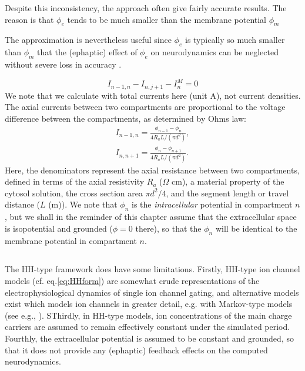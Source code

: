 Despite this inconsistency, the approach often give fairly accurate results. The reason is that $\phi_e$ tends to be much smaller than the membrane potential $\phi_m$


The approximation is nevertheless useful since $\phi_e$ is typically so much smaller than $\phi_m$ that the (ephaptic) effect of $\phi_e$ on neurodynamics can be neglected without severe loss in accuracy \cite{anastassiou2015}. 



\begin{equation}
I_{n-1,n} - I_{n,j+1} - I^M_n = 0
\label{eq:Kirch}
\end{equation}
We note that we calculate with total currents here (unit A), not current densities. The axial currents between two compartments are proportional to the voltage difference between the compartments, as determined by Ohms law:
\begin{eqnarray}
I_{n-1,n} = \frac{\phi_{n-1}-\phi_n}{4 R_a L/(\pi d^2)}, \nonumber \\ 
I_{n,n+1} = \frac{\phi_{n}-\phi_{n+1}}{4 R_a L/(\pi d^2)}.
\label{eq:axialcurrents}
\end{eqnarray}
Here, the denominators represent the axial resistance between two compartments, defined in terms of the axial resistivity $R_a$ ($\Omega$ cm), a material property of the cytosol solution, the cross section area $\pi d^2/4$, and the segment length or travel distance ($L$ (m)). We note that $\phi_n$ is the \emph{intracellular} potential in compartment $n$, but we shall in the reminder of this chapter assume that the extracellular space is isopotential and grounded ($\phi = 0$ there), so that the $\phi_n$ will be identical to the membrane potential in compartment $n$.

\subsection{}
The HH-type framework does have some limitations. Firstly, HH-type ion channel models (cf. eq.\ref{eq:HHform}) are somewhat crude representations of the electrophysiological dynamics of single ion channel gating, and alternative models exist which models ion channels in greater detail, e.g. with Markov-type models (see e.g., \cite{Destexhe1994, balbi2017}). SThirdly, in HH-type models, ion concentrations of the main charge carriers are assumed to remain effectively constant under the simulated period. Fourthly, the extracellular potential is assumed to be constant and grounded, so that it does not provide any (ephaptic) feedback effects on the computed neurodynamics. 

